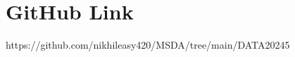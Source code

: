 \documentclass[journal,transmag]{J-NaNA}
\begin{document}






%


\appendices
\section{GitHub Link}

https://github.com/nikhileasy420/MSDA/tree/main/DATA20245

\ifCLASSOPTIONcaptionsoff
  \newpage
\fi



\end{document}
